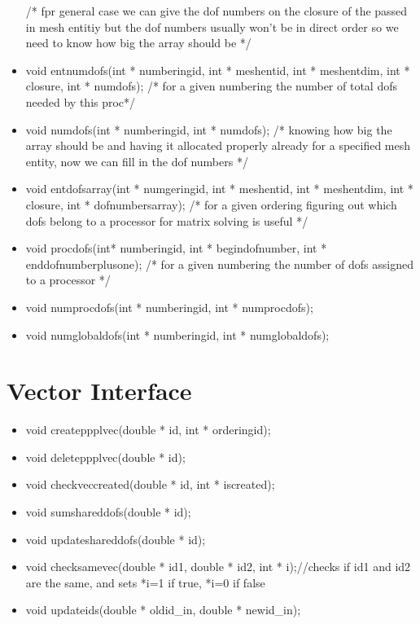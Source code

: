 \begin{itemize}
  /* fpr general case we can give the dof numbers on the closure of
     the passed in mesh entitiy but the dof numbers usually won't
     be in direct order so we need to know how big the array should
     be */
\item  void entnumdofs(int * numberingid, int * meshentid, int * meshentdim,
               int * closure, int * numdofs);
  /* for a given numbering the number of total dofs needed by this proc*/
\item  void numdofs(int * numberingid, int * numdofs);
  /* knowing how big the array should be and having it allocated
     properly already for a specified mesh entity, now we can
     fill in the dof numbers */
\item  void entdofsarray(int * numgeringid, int * meshentid, int * meshentdim,
                     int * closure, int * dofnumbersarray);
  /* for a given ordering figuring out which dofs belong to a processor
     for matrix solving is useful */
\item  void procdofs(int* numberingid, int * begindofnumber, int * enddofnumberplusone);
  /* for a given numbering the number of dofs assigned to a processor */
\item  void numprocdofs(int * numberingid, int * numprocdofs); 
\item  void numglobaldofs(int * numberingid, int * numglobaldofs);
\end{itemize}
\section{Vector Interface}
\begin{itemize}
\item   void createppplvec(double * id, int * orderingid);
\item   void deleteppplvec(double * id);
\item   void checkveccreated(double * id, int * iscreated);
\item   void sumshareddofs(double * id);
\item   void updateshareddofs(double * id);
\item   void checksamevec(double * id1, double * id2, int * i);//checks if id1 and id2 are the same, and sets *i=1 if true, *i=0 if false
\item   void updateids(double * oldid\_in, double * newid\_in);
\end{itemize}

